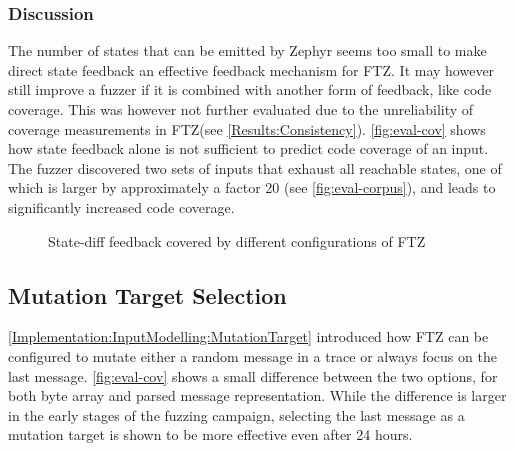 \documentclass[twocolumn]{article}
\newcommand{\proj}{FTZ\xspace}
\begin{document}
\subsubsection*{Discussion}

The number of states that can be emitted by Zephyr seems too small to make direct state feedback an effective feedback mechanism for \proj. It may however still improve a fuzzer if it is combined with another form of feedback, like code coverage. This was however not further evaluated due to the unreliability of coverage measurements in \proj (see \cref{Results:Consistency}). \cref{fig:eval-cov} shows how state feedback alone is not sufficient to predict code coverage of an input. The fuzzer discovered two sets of inputs that exhaust all reachable states, one of which is larger by approximately a factor 20 (see \cref{fig:eval-corpus}), and leads to significantly increased code coverage.

\begin{figure}
  \caption{State-diff feedback covered by different configurations of \proj}
  \label{fig:eval-state-diff-map}
\end{figure}

\subsection{Mutation Target Selection}

\cref{Implementation:InputModelling:MutationTarget} introduced how \proj can be configured to mutate either a random message in a trace or always focus on the last message. \cref{fig:eval-cov} shows a small difference between the two options, for both byte array and parsed message representation. While the difference is larger in the early stages of the fuzzing campaign, selecting the last message as a mutation target is shown to be more effective even after 24 hours.
\end{document}
